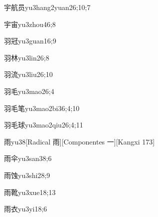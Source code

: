\begin{verbete}{宇航员}{yu3hang2yuan2}{6;10;7}
\end{verbete}

\begin{verbete}{宇宙}{yu3zhou4}{6;8}
\end{verbete}

\begin{verbete}{羽冠}{yu3guan1}{6;9}
\end{verbete}

\begin{verbete}{羽林}{yu3lin2}{6;8}
\end{verbete}

\begin{verbete}{羽流}{yu3liu2}{6;10}
\end{verbete}

\begin{verbete}{羽毛}{yu3mao2}{6;4}
\end{verbete}

\begin{verbete}{羽毛笔}{yu3mao2bi3}{6;4;10}
\end{verbete}

\begin{verbete}{羽毛球}{yu3mao2qiu2}{6;4;11}
\end{verbete}

\begin{verbete}{雨}{yu3}{8}[Radical 雨][Componentes 一][Kangxi 173]
\end{verbete}

\begin{verbete}{雨伞}{yu3san3}{8;6}
\end{verbete}

\begin{verbete}{雨蚀}{yu3shi2}{8;9}
\end{verbete}

\begin{verbete}{雨靴}{yu3xue1}{8;13}
\end{verbete}

\begin{verbete}{雨衣}{yu3yi1}{8;6}
\end{verbete}

